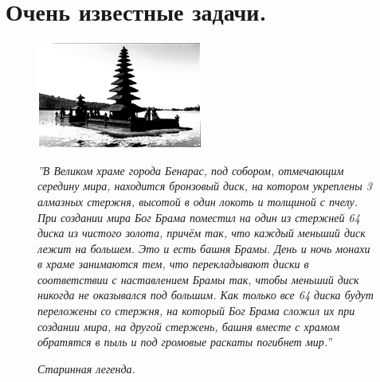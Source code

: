\section{Очень известные задачи.}

{\setlength{\intextsep}{2pt}
\begin{figure}[h]
\begin{minipage}{0.3\linewidth}
    \includegraphics[scale=0.7]{img/sobor.png}
\end{minipage}
\begin{minipage}{0.69\linewidth}\setlength{\parindent}{1.5em}
\textit{
''В Великом храме города Бенарас, под собором, отмечающим середину мира, находится бронзовый диск, на котором укреплены 3 алмазных стержня, высотой в один локоть и толщиной с пчелу. При создании мира Бог Брама поместил на один из стержней 64 диска из чистого золота, причём так, что каждый меньший диск лежит на большем. Это и есть башня Брамы. День и ночь монахи в храме занимаются тем, что перекладывают диски в соответствии с наставлением Брамы так, чтобы меньший диск никогда не оказывался под большим. Как только все 64 диска будут переложены со стержня, на который Бог Брама сложил их при создании мира, на другой стержень, башня вместе с храмом обратятся в пыль и под громовые раскаты погибнет мир.''}
\par
\hspace*{0pt}\hfill \textit{Старинная легенда.}
\end{minipage}
\hfill
\end{figure}}

